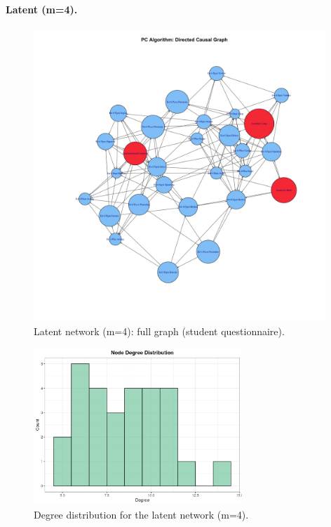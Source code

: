 \documentclass[11pt]{article}
\begin{document}
\paragraph{Latent (m=4).}
\begin{figure}[H]
  \centering
  \includegraphics[width=0.98\textwidth]{pc_full_network_estudiante_latent_m4.png}
  \caption{Latent network (m=4): full graph (student questionnaire).}
\end{figure}

\begin{figure}[H]
  \centering
  \includegraphics[width=0.7\textwidth]{pc_degree_distribution_estudiante_latent_m4.png}
  \caption{Degree distribution for the latent network (m=4).}
\end{figure}
\end{document}
